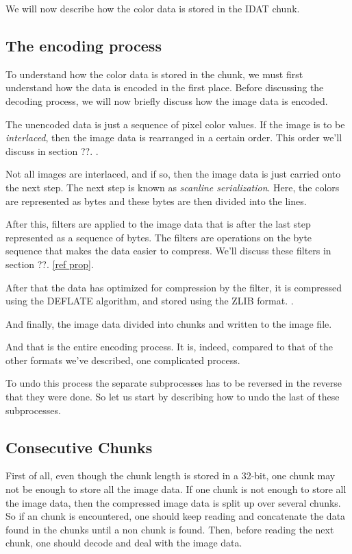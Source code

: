 We will now describe how the color data is stored in the IDAT chunk.

\subsection{The encoding process}

To understand how the color data is stored in the \IDAT chunk, we must
first understand how the data is encoded in the first place. Before
discussing the decoding process, we will now briefly discuss how the
image data is encoded.

The unencoded data is just a sequence of pixel color values. If the
image is to be \textit{interlaced}, then the image data is rearranged in a certain
order. This order we'll discuss in section ??. .

Not all images are interlaced, and if so, then the image data is just
carried onto the next step. The next step is known as \textit{scanline
  serialization}. Here, the colors are represented as bytes and these
bytes are then divided into the lines.

After this, filters are applied to the image data that is after the
last step represented as a sequence of bytes. The filters are
operations on the byte sequence that makes the data easier to
compress. We'll discuss these filters in section ??. \ref{ref prop}.

After that the data has optimized for compression by the filter, it is
compressed using the DEFLATE algorithm, and stored using the ZLIB
format. .

And finally, the image data divided into \IDAT chunks and written to
the image file.

And that is the entire encoding process. It is, indeed, compared to
that of the other formats we've described, one complicated
process.

To undo this process the separate subprocesses has to be reversed in
the reverse that they were done. So let us start by describing how to
undo the last of these subprocesses.

\subsection{Consecutive Chunks}

First of all, even though the chunk length is stored in a 32-bit, one
chunk may not be enough to store all the image data. If one chunk is
not enough to store all the image data, then the compressed image data
is split up over several \IDAT chunks. So if an \IDAT chunk is
encountered, one should keep reading and concatenate the data found in
the \IDAT chunks until a non \IDAT chunk is found. Then, before
reading the next chunk, one should decode and deal with the image
data.

